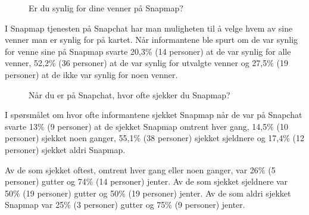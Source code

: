 \begin{figure}[H]
    \centering
    \caption{Er du synlig for dine venner på Snapmap?}
\end{figure}
I Snapmap tjenesten på Snapchat har man muligheten til å velge hvem av sine venner man er synlig for på kartet. Når informantene ble spurt om de var synlig for venne sine på Snapmap svarte 20,3\% (14 personer) at de var synlig for alle venner, 52,2\% (36 personer) at de var synlig for utvalgte venner og 27,5\% (19 personer) at de ikke var synlig for noen venner.

\begin{figure}[H]
    \centering
    \caption{Når du er på Snapchat, hvor ofte sjekker du Snapmap?}
\end{figure}
I spørsmålet om hvor ofte informantene sjekket Snapmap når de var på Snapchat svarte 13\% (9 personer) at de sjekket Snapmap omtrent hver gang, 14,5\% (10 personer) sjekket noen ganger, 55,1\% (38 personer) sjekket sjeldnere og 17,4\% (12 personer) sjekket aldri Snapmap.

Av de som sjekket oftest, omtrent hver gang eller noen ganger, var 26\% (5 personer) gutter og 74\% (14 personer) jenter. Av de som sjekket sjeldnere var 50\% (19 personer) gutter og 50\% (19 personer) jenter. Av de som aldri sjekket Snapmap var 25\% (3 personer) gutter og 75\% (9 personer) jenter. 

